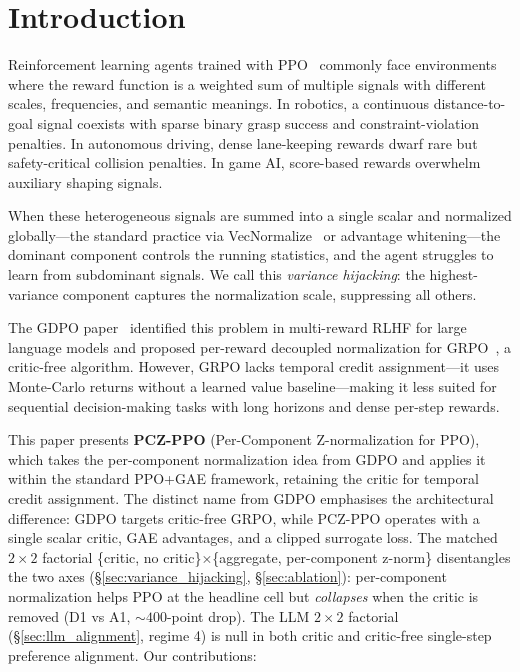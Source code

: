 \documentclass[11pt,a4paper]{article}
\begin{document}
\section{Introduction}

Reinforcement learning agents trained with PPO~\cite{schulman2017ppo} commonly face environments where the reward function is a weighted sum of multiple signals with different scales, frequencies, and semantic meanings. In robotics, a continuous distance-to-goal signal coexists with sparse binary grasp success and constraint-violation penalties. In autonomous driving, dense lane-keeping rewards dwarf rare but safety-critical collision penalties. In game AI, score-based rewards overwhelm auxiliary shaping signals.

When these heterogeneous signals are summed into a single scalar and normalized globally---the standard practice via VecNormalize~\cite{raffin2021sb3} or advantage whitening---the dominant component controls the running statistics, and the agent struggles to learn from subdominant signals. We call this \emph{variance hijacking}: the highest-variance component captures the normalization scale, suppressing all others.

The GDPO paper~\cite{shao2024gdpo} identified this problem in multi-reward RLHF for large language models and proposed per-reward decoupled normalization for GRPO~\cite{shao2024grpo}, a critic-free algorithm. However, GRPO lacks temporal credit assignment---it uses Monte-Carlo returns without a learned value baseline---making it less suited for sequential decision-making tasks with long horizons and dense per-step rewards.

This paper presents \textbf{PCZ-PPO} (Per-Component Z-normalization for PPO), which takes the per-component normalization idea from GDPO and applies it within the standard PPO+GAE framework, retaining the critic for temporal credit assignment. The distinct name from GDPO emphasises the architectural difference: GDPO targets critic-free GRPO, while PCZ-PPO operates with a single scalar critic, GAE advantages, and a clipped surrogate loss. The matched $2{\times}2$ factorial \{critic, no critic\}$\times$\{aggregate, per-component z-norm\} disentangles the two axes (§\ref{sec:variance_hijacking}, §\ref{sec:ablation}): per-component normalization helps PPO at the headline cell but \emph{collapses} when the critic is removed (D1 vs A1, ${\sim}400$-point drop). The LLM $2{\times}2$ factorial (§\ref{sec:llm_alignment}, regime 4) is null in both critic and critic-free single-step preference alignment. Our contributions:
\end{document}
